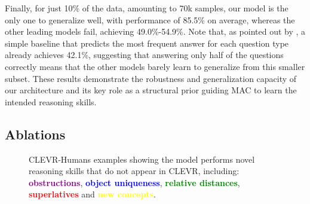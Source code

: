 \documentclass[fleqn]{article}
\begin{document}
Finally, for just 10\% of the data, amounting to 70k samples, our model is the only one to generalize well, with performance of 85.5\% on average, whereas the other leading models fail, achieving 49.0\%-54.9\%. Note that, as pointed out by \citet{clevr}, a simple baseline that predicts the most frequent answer for each question type already achieves 42.1\%, suggesting that answering only half of the questions correctly means that the other models barely learn to generalize from this smaller subset. These results demonstrate the robustness and generalization capacity of our architecture and its key role as a structural prior guiding MAC to learn the intended reasoning skills.

\subsection{Ablations}
\label{sec:ablations}

\begin{figure}[t]
\captionsetup[subfloat]{justification=raggedright, font=scriptsize,labelformat=empty,textfont=it}
\centering
{}
\hfill
{}
\hfill
{}
\hfill
{}
\hfill
{}
\caption{CLEVR-Humans examples showing the model performs novel reasoning skills that do not appear in CLEVR, including: \textcolor{purple}{\textbf{obstructions}}, \textcolor{blue}{\textbf{object uniqueness}}, \textcolor{green}{\textbf{relative distances}}, \textcolor{red}{\textbf{superlatives}} and \textcolor{yellow}{\textbf{new concepts}}. }
\label{hexample}
\label{fig:hexample}
\end{figure}
\end{document}
